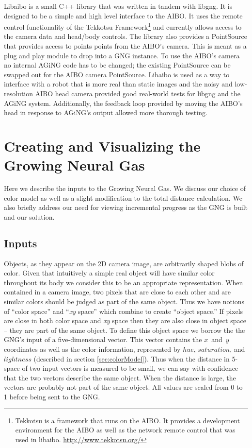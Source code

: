 \documentclass{article}
\renewcommand{\|}{\origbar} %
\newcommand{\xyspace}{{\em xy} space}
\begin{document}
Libaibo is a small C++ library that was written in tandem with libgng. It is designed to be a simple and high level interface to the AIBO. It uses the remote control functionality of the Tekkotsu Framework\footnote{Tekkotsu is a framework that runs on the AIBO. It provides a development environment for the AIBO as well as the network remote control that was used in libaibo. \url{http://www.tekkotsu.org/}} and currently allows access to the camera data and head/body controls. The library also provides a PointSource that provides access to points points from the AIBO's camera. This is meant as a plug and play module to drop into a GNG instance. To use the AIBO's camera no internal AGiNG code has to be changed; the existing PointSource can be swapped out for the AIBO camera PointSource. Libaibo is used as a way to interface with a robot that is more real than static images and the noisy and low-resolution AIBO head camera provided good real-world tests for libgng and the AGiNG system. Additionally, the feedback loop provided by moving the AIBO's head in response to AGiNG's output allowed more thorough testing. 

\section{Creating and Visualizing the Growing Neural Gas}
\label{sec:creatingGNG}

Here we describe the inputs to the Growing Neural Gas. We discuss our choice of color model as well as a slight modification to the total distance calculation. We also briefly address our need for viewing incremental progress as the GNG is built and our solution.

\subsection{Inputs}

Objects, as they appear on the 2D camera image, are arbitrarily shaped blobs of color. Given that intuitively a simple real object will have similar color throughout its body we consider this to be an appropriate representation. When contained in a camera image, two pixels that are close to each other and are similar colors should be judged as part of the same object. Thus we have notions of ``color space'' and ``\xyspace'' which combine to create ``object space.'' If pixels are close in both color space and \xyspace{} then they are also close in object space -- they are part of the same object. To define this object space we borrow the the GNG's input of a five-dimensional vector. This vector contains the $x$~and~$y$ coordinates as well as the color information, represented by $hue$, $saturation$, and $lightness$ (described in section \ref{sec:colorModel}). Thus when the distance in 5-space of two input vectors is measured to be small, we can say with confidence that the two vectors describe the same object. When the distance is large, the vectors are probably not part of the same object. All values are scaled from 0 to 1 before being sent to the GNG.
\end{document}
